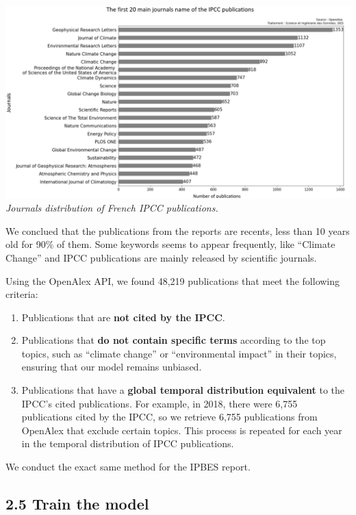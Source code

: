 \documentclass[
]{article}
\providecommand{\tightlist}{%
  \setlength{\itemsep}{0pt}\setlength{\parskip}{0pt}}
\begin{document}
\includegraphics{./images/locations_distribution_IPCC_model.png}
\emph{Journals distribution of French IPCC publications.}

We conclued that the publications from the reports are recents, less
than 10 years old for 90\% of them. Some keywords seems to appear
frequently, like ``Climate Change'' and IPCC publications are mainly
released by scientific journals.

Using the OpenAlex API, we found 48,219 publications that meet the
following criteria:

\begin{enumerate}
\def\labelenumi{\arabic{enumi}.}
\tightlist
\item
  Publications that are \textbf{not cited by the IPCC}.
\item
  Publications that \textbf{do not contain specific terms} according to
  the top topics, such as ``climate change'' or ``environmental impact''
  in their topics, ensuring that our model remains unbiased.
\item
  Publications that have a \textbf{global temporal distribution
  equivalent} to the IPCC's cited publications. For example, in 2018,
  there were 6,755 publications cited by the IPCC, so we retrieve 6,755
  publications from OpenAlex that exclude certain topics. This process
  is repeated for each year in the temporal distribution of IPCC
  publications.
\end{enumerate}

We conduct the exact same method for the IPBES report.

\hypertarget{train-the-model}{%
\subsection{2.5 Train the model}\label{train-the-model}}
\end{document}

